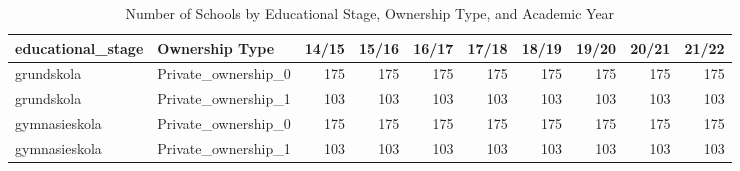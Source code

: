 \begin{table}[!h]
\centering
\caption{Number of Schools by Educational Stage, Ownership Type, and Academic Year}
\centering
\begin{tabular}[t]{llrrrrrrrr}
\toprule
educational\_stage & Ownership Type & 14/15 & 15/16 & 16/17 & 17/18 & 18/19 & 19/20 & 20/21 & 21/22\\
\midrule
grundskola & Private\_ownership\_0 & 175 & 175 & 175 & 175 & 175 & 175 & 175 & 175\\
grundskola & Private\_ownership\_1 & 103 & 103 & 103 & 103 & 103 & 103 & 103 & 103\\
gymnasieskola & Private\_ownership\_0 & 175 & 175 & 175 & 175 & 175 & 175 & 175 & 175\\
gymnasieskola & Private\_ownership\_1 & 103 & 103 & 103 & 103 & 103 & 103 & 103 & 103\\
\bottomrule
\end{tabular}
\end{table}

